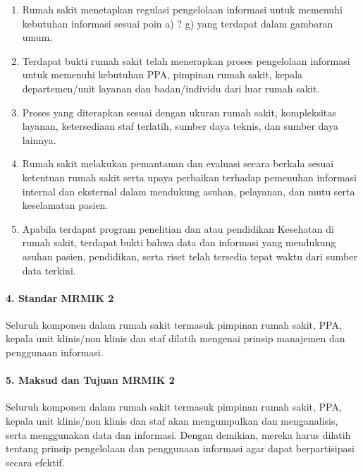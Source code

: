 \documentclass[
]{book}
\providecommand{\tightlist}{%
  \setlength{\itemsep}{0pt}\setlength{\parskip}{0pt}}
\begin{document}
\begin{enumerate}
\def\labelenumi{\alph{enumi}.}
\tightlist
\item
  Rumah sakit menetapkan regulasi pengelolaan informasi untuk memenuhi kebutuhan informasi sesuai poin a) ? g) yang terdapat dalam gambaran umum.
\item
  Terdapat bukti rumah sakit telah menerapkan proses pengelolaan informasi untuk memenuhi kebutuhan PPA, pimpinan rumah sakit, kepala departemen/unit layanan dan badan/individu dari luar rumah sakit.
\item
  Proses yang diterapkan sesuai dengan ukuran rumah sakit, kompleksitas layanan, ketersediaan staf terlatih, sumber daya teknis, dan sumber daya lainnya.
\item
  Rumah sakit melakukan pemantauan dan evaluasi secara berkala sesuai ketentuan rumah sakit serta upaya perbaikan terhadap pemenuhan informasi internal dan eksternal dalam mendukung asuhan, pelayanan, dan mutu serta keselamatan pasien.
\item
  Apabila terdapat program penelitian dan atau pendidikan Kesehatan di rumah sakit, terdapat bukti bahwa data dan informasi yang mendukung asuhan pasien, pendidikan, serta riset telah tersedia tepat waktu dari sumber data terkini.
\end{enumerate}

\hypertarget{standar-mrmik-2}{%
\paragraph*{4. Standar MRMIK 2}\label{standar-mrmik-2}}

Seluruh komponen dalam rumah sakit termasuk pimpinan rumah sakit, PPA, kepala unit klinis/non klinis dan staf dilatih mengenai prinsip manajemen dan penggunaan informasi.

\hypertarget{maksud-dan-tujuan-mrmik-2}{%
\paragraph*{5. Maksud dan Tujuan MRMIK 2}\label{maksud-dan-tujuan-mrmik-2}}

Seluruh komponen dalam rumah sakit termasuk pimpinan rumah sakit, PPA, kepala unit klinis/non klinis dan staf akan mengumpulkan dan menganalisis, serta menggunakan data dan informasi. Dengan demikian, mereka harus dilatih tentang prinsip pengelolaan dan penggunaan informasi agar dapat berpartisipasi secara efektif.
\end{document}
